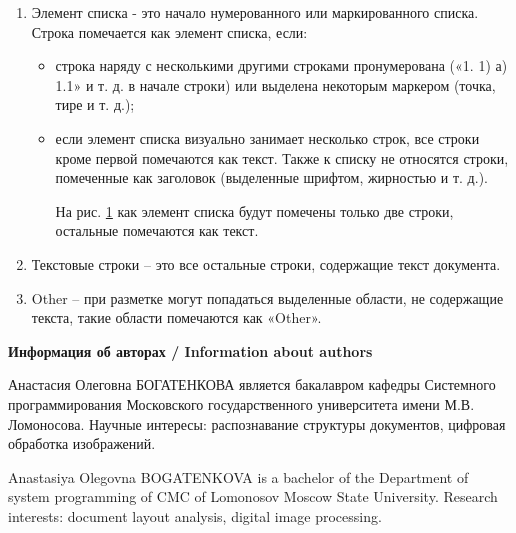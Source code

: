\documentclass{ProcISPRAS}
\begin{document}
\begin{enumerate}
	\item Элемент списка - это начало нумерованного или маркированного списка. Строка помечается как элемент списка, если:
	\begin{itemize}
		\item строка наряду с несколькими другими строками пронумерована («1. 1) а) 1.1» и т. д. в начале строки) или выделена некоторым маркером (точка, тире и т. д.);
		
		\item если элемент списка визуально занимает несколько строк, все строки кроме первой помечаются как текст. Также к списку не относятся строки, помеченные как заголовок (выделенные шрифтом, жирностью и т. д.).
		
		На рис. \ref{fig:4} как элемент списка будут помечены только две строки, остальные помечаются как текст.
		
		\begin{figure}[ht]
		    \label{fig:4}
		\end{figure}
		
	\end{itemize}
	
	\item Текстовые строки -- это все остальные строки, содержащие текст документа.
	\item Other -- при разметке могут попадаться выделенные области, не содержащие текста, такие области помечаются как «Other».
	
\end{enumerate}



{\vskip 12pt\normalfont\sffamily\bfseries\large Информация об авторах / Information about authors}
\setlength{\parskip}{6pt}

Анастасия Олеговна БОГАТЕНКОВА является бакалавром кафедры Системного программирования Московского государственного университета имени М.В. Ломоносова. Научные интересы: распознавание структуры документов, цифровая обработка изображений.

Anastasiya Olegovna BOGATENKOVA is a bachelor of the Department of system programming of CMC of Lomonosov Moscow State University. Research interests: document layout analysis, digital image processing.
\end{document}
